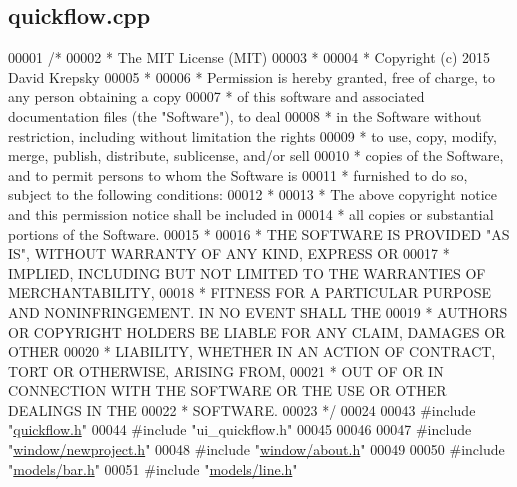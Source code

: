 \hypertarget{quickflow_8cpp_source}{}\subsection{quickflow.\+cpp}
\label{quickflow_8cpp_source}

\begin{DoxyCode}
00001 \textcolor{comment}{/*}
00002 \textcolor{comment}{ * The MIT License (MIT)}
00003 \textcolor{comment}{ *}
00004 \textcolor{comment}{ * Copyright (c) 2015 David Krepsky}
00005 \textcolor{comment}{ *}
00006 \textcolor{comment}{ * Permission is hereby granted, free of charge, to any person obtaining a copy}
00007 \textcolor{comment}{ * of this software and associated documentation files (the "Software"), to deal}
00008 \textcolor{comment}{ * in the Software without restriction, including without limitation the rights}
00009 \textcolor{comment}{ * to use, copy, modify, merge, publish, distribute, sublicense, and/or sell}
00010 \textcolor{comment}{ * copies of the Software, and to permit persons to whom the Software is}
00011 \textcolor{comment}{ * furnished to do so, subject to the following conditions:}
00012 \textcolor{comment}{ *}
00013 \textcolor{comment}{ * The above copyright notice and this permission notice shall be included in}
00014 \textcolor{comment}{ * all copies or substantial portions of the Software.}
00015 \textcolor{comment}{ *}
00016 \textcolor{comment}{ * THE SOFTWARE IS PROVIDED "AS IS", WITHOUT WARRANTY OF ANY KIND, EXPRESS OR}
00017 \textcolor{comment}{ * IMPLIED, INCLUDING BUT NOT LIMITED TO THE WARRANTIES OF MERCHANTABILITY,}
00018 \textcolor{comment}{ * FITNESS FOR A PARTICULAR PURPOSE AND NONINFRINGEMENT. IN NO EVENT SHALL THE}
00019 \textcolor{comment}{ * AUTHORS OR COPYRIGHT HOLDERS BE LIABLE FOR ANY CLAIM, DAMAGES OR OTHER}
00020 \textcolor{comment}{ * LIABILITY, WHETHER IN AN ACTION OF CONTRACT, TORT OR OTHERWISE, ARISING FROM,}
00021 \textcolor{comment}{ * OUT OF OR IN CONNECTION WITH THE SOFTWARE OR THE USE OR OTHER DEALINGS IN THE}
00022 \textcolor{comment}{ * SOFTWARE.}
00023 \textcolor{comment}{ */}
00024 
00043 \textcolor{preprocessor}{#include "\hyperlink{quickflow_8h}{quickflow.h}"}
00044 \textcolor{preprocessor}{#include "ui\_quickflow.h"}
00045 
00046 
00047 \textcolor{preprocessor}{#include "\hyperlink{newproject_8h}{window/newproject.h}"}
00048 \textcolor{preprocessor}{#include "\hyperlink{about_8h}{window/about.h}"}
00049 
00050 \textcolor{preprocessor}{#include "\hyperlink{bar_8h}{models/bar.h}"}
00051 \textcolor{preprocessor}{#include "\hyperlink{line_8h}{models/line.h}"}

\end{DoxyCode}
